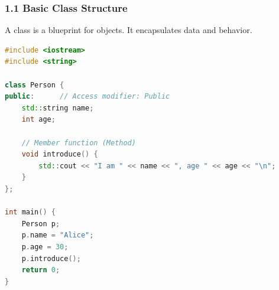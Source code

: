 \hypertarget{basic-class-structure}{%
\subsubsection{1.1 Basic Class Structure}\label{basic-class-structure}}

A class is a blueprint for objects. It encapsulates data and behavior.

\begin{lstlisting}[language={C++}]
#include <iostream>
#include <string>

class Person {
public:      // Access modifier: Public
    std::string name;
    int age;

    // Member function (Method)
    void introduce() {
        std::cout << "I am " << name << ", age " << age << "\n";
    }
};

int main() {
    Person p;
    p.name = "Alice";
    p.age = 30;
    p.introduce();
    return 0;
}
\end{lstlisting}

